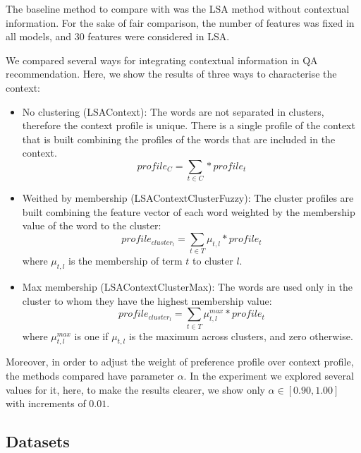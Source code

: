 \documentclass[preprint]{elsarticle}
\begin{document}
\begin{spacing}{1.5}
The baseline method to compare with was the LSA method without contextual information. For the sake of fair comparison, the number of features was fixed in all models, and 30 features were considered in LSA.

We compared several ways for integrating contextual information in QA recommendation. Here, we show the results of three ways to characterise the context:

\begin{itemize}

	\item No clustering (LSAContext): The words are not separated in clusters, therefore the context profile is unique. There is a single profile of the context that is built combining the profiles of the words that are included in the context.
	\begin{equation}
		profile_{C} = \sum_{t \in C} * profile_t
	\end{equation}

	\item Weithed by membership (LSAContextClusterFuzzy): The cluster profiles are built combining the feature vector of each word weighted by the membership value of the word to the cluster:
	\begin{equation}
		profile_{cluster_l} = \sum_{t \in T} \mu_{t,l} * profile_t
	\end{equation}
	\noindent where $\mu_{t,l}$ is the membership of term $t$ to cluster $l$.

	\item Max membership (LSAContextClusterMax): The words are used only in the cluster to whom they have the highest membership value:
	\begin{equation}
		profile_{cluster_l} = \sum_{t \in T} \mu^{max}_{t,l} * profile_t
	\end{equation}
	\noindent where $\mu^{max}_{t,l}$ is one if $\mu_{t,l}$ is the maximum across clusters, and zero otherwise.

\end{itemize}

Moreover, in order to adjust the weight of preference profile over context profile, the methods compared have parameter $\alpha$. In the experiment we explored several values for it, here, to make the results clearer, we show only $\alpha \in [0.90,1.00]$ with increments of $0.01$.

\subsection{Datasets}
\label{sec:case-study-datasets}


\end{spacing}
\end{document}
